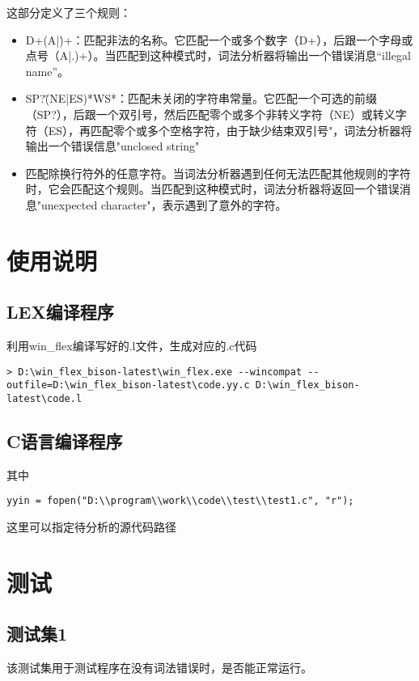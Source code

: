 \documentclass[lang=cn,11pt,a4paper]{elegantpaper}
\begin{document}
这部分定义了三个规则：
\begin{itemize}
    \item {D}+({A}|\.)+：匹配非法的名称。它匹配一个或多个数字（{D}+），后跟一个字母或点号（{A}|.)+）。当匹配到这种模式时，词法分析器将输出一个错误消息“illegal name”。
    \item {SP}?\"({NE}|{ES})*{WS}*：匹配未关闭的字符串常量。它匹配一个可选的前缀（{SP}?），后跟一个双引号，然后匹配零个或多个非转义字符（NE）或转义字符（ES），再匹配零个或多个空格字符，由于缺少结束双引号"，词法分析器将输出一个错误信息"unclosed string"
    \item 匹配除换行符外的任意字符。当词法分析器遇到任何无法匹配其他规则的字符时，它会匹配这个规则。当匹配到这种模式时，词法分析器将返回一个错误消息"unexpected character"，表示遇到了意外的字符。
\end{itemize}

\section{使用说明}

\subsection{LEX编译程序}
利用win\_flex编译写好的.l文件，生成对应的.c代码
\begin{lstlisting}
> D:\win_flex_bison-latest\win_flex.exe --wincompat --outfile=D:\win_flex_bison-latest\code.yy.c D:\win_flex_bison-latest\code.l  
\end{lstlisting}

\subsection{C语言编译程序}
其中
\begin{lstlisting}
yyin = fopen("D:\\program\\work\\code\\test\\test1.c", "r");
\end{lstlisting}
这里可以指定待分析的源代码路径

\section{测试}

\subsection{测试集1}
该测试集用于测试程序在没有词法错误时，是否能正常运行。
\end{document}
